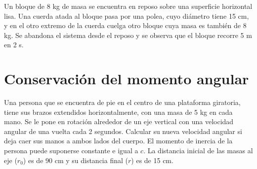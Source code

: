 \documentclass[addpoints]{exam}
\begin{document}
\begin{questions}
    \question Un bloque de 8 kg de masa se encuentra en reposo sobre una superficie horizontal lisa. Una cuerda atada al bloque pasa por una polea, cuyo diámetro tiene 15 cm, y en el otro extremo de la cuerda cuelga otro bloque cuya masa es también de 8 kg. Se abandona el sistema desde el reposo y se observa que el bloque recorre 5 m en 2 s.

    \section{Conservación del momento angular}

    \question Una persona que se encuentra de pie en el centro de una plataforma giratoria, tiene sus brazos extendidos horizontalmente, con una masa de 5 kg en cada mano. Se le pone en rotación alrededor de un eje vertical con una velocidad angular de una vuelta cada 2 segundos. Calcular su nueva velocidad angular si deja caer sus manos a ambos lados del cuerpo. El momento de inercia de la persona puede suponerse constante e igual a $c$. La distancia inicial de las masas al eje ($r_0$) es de 90 cm y su distancia final ($r$) es de 15 cm.


\end{questions}
\end{document}
